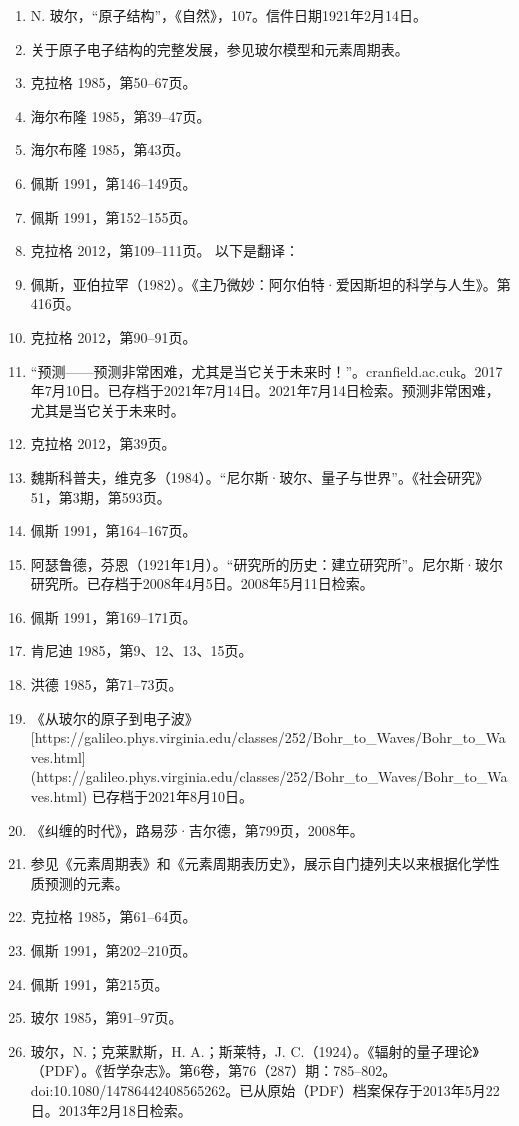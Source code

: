 \begin{enumerate}
\item N. 玻尔，“原子结构”，《自然》，107。信件日期1921年2月14日。
\item 关于原子电子结构的完整发展，参见玻尔模型和元素周期表。
\item 克拉格 1985，第50–67页。
\item 海尔布隆 1985，第39–47页。
\item 海尔布隆 1985，第43页。
\item 佩斯 1991，第146–149页。
\item 佩斯 1991，第152–155页。
\item 克拉格 2012，第109–111页。
以下是翻译：

\item 佩斯，亚伯拉罕（1982）。《主乃微妙：阿尔伯特·爱因斯坦的科学与人生》。第416页。
\item 克拉格 2012，第90–91页。
\item “预测——预测非常困难，尤其是当它关于未来时！”。cranfield.ac.cuk。2017年7月10日。已存档于2021年7月14日。2021年7月14日检索。预测非常困难，尤其是当它关于未来时。
\item 克拉格 2012，第39页。
\item 魏斯科普夫，维克多（1984）。“尼尔斯·玻尔、量子与世界”。《社会研究》51，第3期，第593页。
\item 佩斯 1991，第164–167页。
\item 阿瑟鲁德，芬恩（1921年1月）。“研究所的历史：建立研究所”。尼尔斯·玻尔研究所。已存档于2008年4月5日。2008年5月11日检索。
\item 佩斯 1991，第169–171页。
\item 肯尼迪 1985，第9、12、13、15页。
\item 洪德 1985，第71–73页。
\item 《从玻尔的原子到电子波》[https://galileo.phys.virginia.edu/classes/252/Bohr\_to\_Waves/Bohr\_to\_Waves.html](https://galileo.phys.virginia.edu/classes/252/Bohr_to_Waves/Bohr_to_Waves.html) 已存档于2021年8月10日。
\item 《纠缠的时代》，路易莎·吉尔德，第799页，2008年。
\item 参见《元素周期表》和《元素周期表历史》，展示自门捷列夫以来根据化学性质预测的元素。
\item 克拉格 1985，第61–64页。
\item 佩斯 1991，第202–210页。
\item 佩斯 1991，第215页。
\item 玻尔 1985，第91–97页。
\item 玻尔，N.；克莱默斯，H. A.；斯莱特，J. C.（1924）。《辐射的量子理论》（PDF）。《哲学杂志》。第6卷，第76（287）期：785–802。doi:10.1080/14786442408565262。已从原始（PDF）档案保存于2013年5月22日。2013年2月18日检索。

\end{enumerate}
